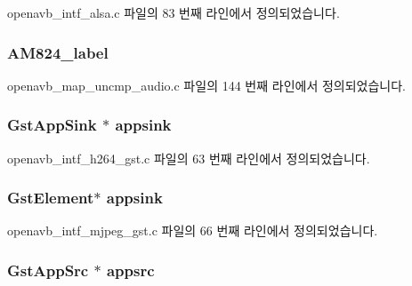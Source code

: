 openavb\+\_\+intf\+\_\+alsa.\+c 파일의 83 번째 라인에서 정의되었습니다.

\subsubsection[{\texorpdfstring{A\+M824\+\_\+label}{AM824_label}}]{ A\+M824\+\_\+label}\hypertarget{structpvt__data__t_a38cae627dba8ab1a49cff7afc89d99ed}{}\label{structpvt__data__t_a38cae627dba8ab1a49cff7afc89d99ed}


openavb\+\_\+map\+\_\+uncmp\+\_\+audio.\+c 파일의 144 번째 라인에서 정의되었습니다.

\subsubsection[{\texorpdfstring{appsink}{appsink}}]{\setlength{\rightskip}{0pt plus 5cm}Gst\+App\+Sink $\ast$ appsink}\hypertarget{structpvt__data__t_a3831070f5306380e16c589d7035c5409}{}\label{structpvt__data__t_a3831070f5306380e16c589d7035c5409}


openavb\+\_\+intf\+\_\+h264\+\_\+gst.\+c 파일의 63 번째 라인에서 정의되었습니다.

\subsubsection[{\texorpdfstring{appsink}{appsink}}]{\setlength{\rightskip}{0pt plus 5cm}Gst\+Element$\ast$ appsink}\hypertarget{structpvt__data__t_acb9960605ecf9f62aa5508bde953b464}{}\label{structpvt__data__t_acb9960605ecf9f62aa5508bde953b464}


openavb\+\_\+intf\+\_\+mjpeg\+\_\+gst.\+c 파일의 66 번째 라인에서 정의되었습니다.

\subsubsection[{\texorpdfstring{appsrc}{appsrc}}]{\setlength{\rightskip}{0pt plus 5cm}Gst\+App\+Src $\ast$ appsrc}\hypertarget{structpvt__data__t_a2475dfe3881dd35d1bee8401968eb94c}{}\label{structpvt__data__t_a2475dfe3881dd35d1bee8401968eb94c}


